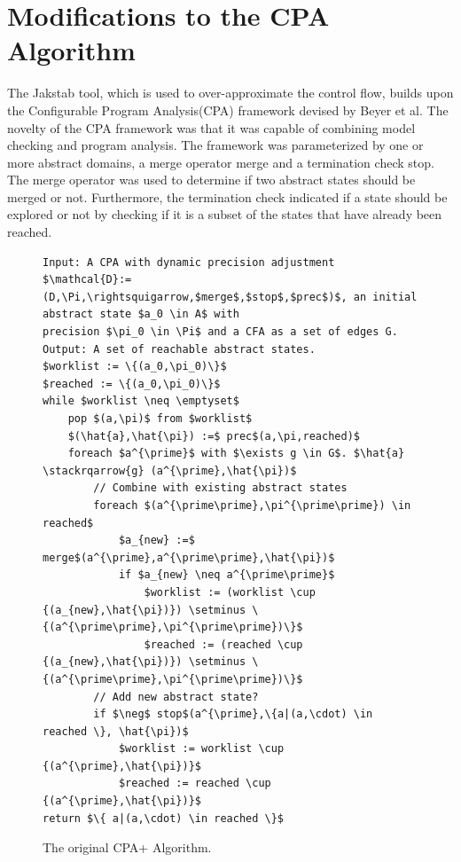 \documentclass{kththesis}
\newcommand\stackrqarrow[1]{%
    \mathrel{\stackon[2pt]{$\rightsquigarrow$}{$\scriptscriptstyle#1$}}}
\newcommand{\fbcomment}[1]{{#1}}
\renewcommand{\fbcomment}[1]{}
\begin{document}
\section{Modifications to the CPA Algorithm}\label{sec:modsToCPA}
\fbcomment{\color{red}Goal: Describe the origin of the CPA Algorithm and why it has morphed into the CPA+ algorithm and Jakstab algorithm. Additionally, explain how and why it was changed in this thesis.}
The Jakstab tool, which is used to over-approximate the control flow, builds upon the Configurable Program Analysis(CPA) framework devised by Beyer et al\cite{cpaAlgo}. The novelty of the CPA framework was that it was capable of combining model checking and program analysis. The framework was parameterized by one or more abstract domains, a merge operator merge and a termination check stop. The merge operator was used to determine if two abstract states should be merged or not. Furthermore, the termination check indicated if a state should be explored or not by checking if it is a subset of the states that have already been reached. %
\begin{figure}[thb]
    \centering
\begin{algorithmFrame}
\begin{lstlisting}[style=algorithm]
Input: A CPA with dynamic precision adjustment 
$\mathcal{D}:=(D,\Pi,\rightsquigarrow,$merge$,$stop$,$prec$)$, an initial abstract state $a_0 \in A$ with 
precision $\pi_0 \in \Pi$ and a CFA as a set of edges G.
Output: A set of reachable abstract states.
$worklist := \{(a_0,\pi_0)\}$
$reached := \{(a_0,\pi_0)\}$
while $worklist \neq \emptyset$
    pop $(a,\pi)$ from $worklist$
    $(\hat{a},\hat{\pi}) :=$ prec$(a,\pi,reached)$
    foreach $a^{\prime}$ with $\exists g \in G$. $\hat{a} \stackrqarrow{g} (a^{\prime},\hat{\pi})$
        // Combine with existing abstract states
        foreach $(a^{\prime\prime},\pi^{\prime\prime}) \in reached$
            $a_{new} :=$ merge$(a^{\prime},a^{\prime\prime},\hat{\pi})$
            if $a_{new} \neq a^{\prime\prime}$
                $worklist := (worklist \cup {(a_{new},\hat{\pi})}) \setminus \{(a^{\prime\prime},\pi^{\prime\prime})\}$
                $reached := (reached \cup {(a_{new},\hat{\pi})}) \setminus \{(a^{\prime\prime},\pi^{\prime\prime})\}$
        // Add new abstract state?
        if $\neg$ stop$(a^{\prime},\{a|(a,\cdot) \in reached \}, \hat{\pi})$
            $worklist := worklist \cup {(a^{\prime},\hat{\pi})}$
            $reached := reached \cup {(a^{\prime},\hat{\pi})}$
return $\{ a|(a,\cdot) \in reached \}$
\end{lstlisting}
\end{algorithmFrame}
\caption[The original CPA+ Algorithm.]{The original CPA+ Algorithm.}
    \label{fig:CPAOrig}
\end{figure}
\end{document}
